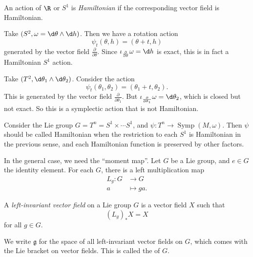 \documentclass[a4paper]{article}
\DeclareMathOperator{\Symp}{Symp}
\begin{document}
\begin{defi}
  An action of $\R$ or $S^1$ is \emph{Hamiltonian} if the corresponding vector field is Hamiltonian.
\end{defi}

\begin{eg}
  Take $(S^2, \omega = \d \theta \wedge \d h)$. Then we have a rotation action
  \[
    \psi_t(\theta, h) = (\theta + t, h)
  \]
  generated by the vector field $\frac{\partial}{\partial \theta}$. Since $\iota_{\frac{\partial}{\partial \theta}} \omega = \d h$ is exact, this is in fact a Hamiltonian $S^1$ action.
\end{eg}

\begin{eg}
  Take $(T^2, \d \theta_1 \wedge \d \theta_2)$. Consider the action
  \[
    \psi_t(\theta_1, \theta_2) = (\theta_1 + t, \theta_2).
  \]
  This is generated by the vector field $\frac{\partial}{\partial \theta_1}$. But $\iota_{\frac{\partial}{\partial \theta_1}}\omega = \d \theta_2$, which is closed but not exact. So this is a symplectic action that is not Hamiltonian.
\end{eg}

\begin{eg}
  Consider the Lie group $G = T^n = S^1 \times \cdots S^1$, and $\psi: T^n \to \Symp(M, \omega)$. Then $\psi$ should be called Hamiltonian when the restriction to each $S^1$ is Hamiltonian in the previous sense, and each Hamiltonian function is preserved by other factors.
\end{eg}

In the general case, we need the ``moment map''. Let $G$ be a Lie group, and $e \in G$ the identity element. For each $G$, there is a left multiplication map
\begin{align*}
  L_g: G &\to G\\
  a &\mapsto ga.
\end{align*}

\begin{defi}
  A \emph{left-invariant vector field} on a Lie group $G$ is a vector field $X$ such that
  \[
    (L_g)_* X = X
  \]
  for all $g \in G$.

  We write $\mathfrak{g}$ for the space of all left-invariant vector fields on $G$, which comes with the Lie bracket on vector fields. This is called the  of $G$.
\end{defi}
\end{document}
